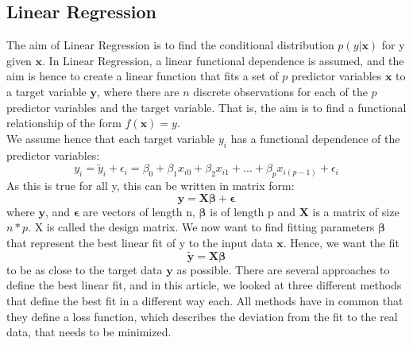 \documentclass[11pt,a4paper,titlepage]{article}
\begin{document}
\subsection{Linear Regression}
The aim of Linear Regression is to find the conditional distribution $p(y|\bm{x})$ for y given $\bm{x}$. In Linear Regression, a linear functional dependence is assumed, and the aim is hence to create a linear function that fits a set of $p$ predictor variables $\bm{x}$ to a target variable $\bm{y}$, where there are $n$ discrete observations for each of the $p$ predictor variables and the target variable. That is, the aim is to find a functional relationship of the form $f(\bm{x})=y$. \\
We assume hence that each target variable $y_i$ has a functional dependence of the predictor variables:
\begin{equation*}
y_i= \tilde{y}_i+\epsilon_i=\beta_0 + \beta_1x_{i0} + \beta_2x_{i1}+...+\beta_px_{i(p-1)} + \epsilon_i
\end{equation*}
As this is true for all y, this can be written in matrix form:
\begin{equation*}
\bm{y}= \bm{X\beta} + \bm{\epsilon}
\end{equation*}
where $\bm{y}$, and $\bm{\epsilon}$ are vectors of length n,  $\bm{\beta}$ is of length p and $\bm{X}$ is a matrix of size $n*p$. X is called the design matrix.
 We now want to find fitting parameters $\bm{\beta}$ that represent the best linear fit of y to the input data $\bm{x}$. Hence, we want the fit
 \begin{equation*}
 \bm{\tilde y}= \bm{X\beta}
 \end{equation*}
 to be as close to the target data $\bm{y}$ as possible.
  There are several approaches to define the best linear fit, and in this article, we looked at three different methods that define the best fit in a different way each. All methods have in common that they define a loss function, which describes the deviation from the fit to the real data, that needs to be minimized.
\end{document}
